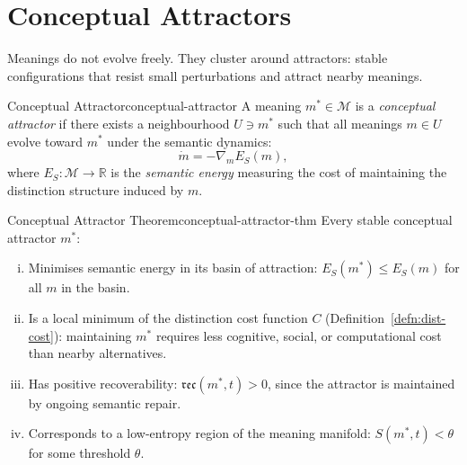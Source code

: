 \documentclass[12pt,twoside,openright]{book}
\newcommand{\reco}{\mathfrak{rec}}
\begin{document}
\section{Conceptual Attractors}

Meanings do not evolve freely. They cluster around
attractors: stable configurations that resist small
perturbations and attract nearby meanings.

\begin{definition}{Conceptual Attractor}{conceptual-attractor}
  A meaning $m^* \in \mathcal{M}$ is a
  \emph{conceptual attractor} if there exists a
  neighbourhood $U \ni m^*$ such that all meanings
  $m \in U$ evolve toward $m^*$ under the semantic
  dynamics:
  \[
    \dot{m} = -\nabla_m E_S(m),
  \]
  where $E_S : \mathcal{M} \to \mathbb{R}$ is the
  \emph{semantic energy} measuring the cost of
  maintaining the distinction structure induced by $m$.
\end{definition}

\begin{theorem}{Conceptual Attractor Theorem}{conceptual-attractor-thm}
  Every stable conceptual attractor $m^*$:
  \begin{enumerate}[(i)]
    \item Minimises semantic energy in its basin of
          attraction:
          $E_S(m^*) \le E_S(m)$ for all $m$ in the basin.
    \item Is a local minimum of the distinction cost
          function $C$ (Definition~\ref{defn:dist-cost}):
          maintaining $m^*$ requires less cognitive,
          social, or computational cost than nearby
          alternatives.
    \item Has positive recoverability:
          $\reco(m^*, t) > 0$, since the attractor
          is maintained by ongoing semantic repair.
    \item Corresponds to a low-entropy region of the
          meaning manifold: $S(m^*, t) < \theta$
          for some threshold $\theta$.
  \end{enumerate}
\end{theorem}
\end{document}
